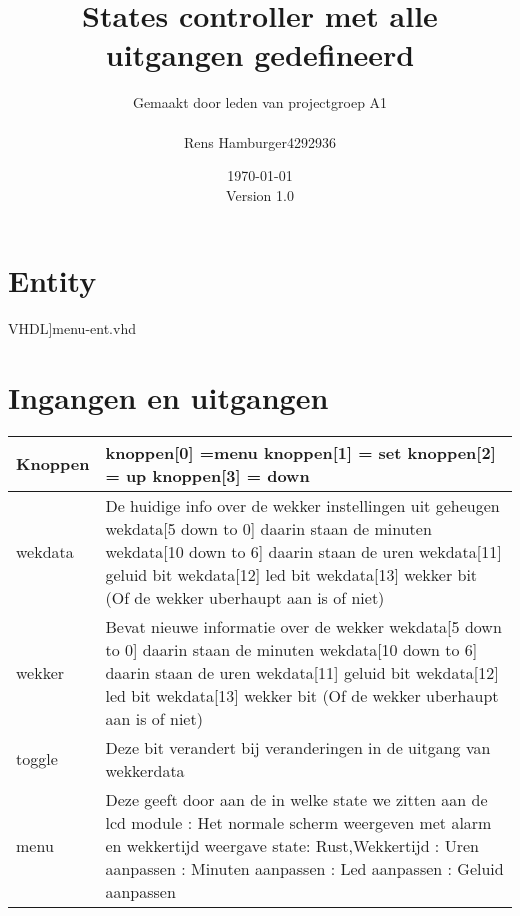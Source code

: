 \documentclass[a4paper, oneside, 10pt]{article}
\title{\textbf{States controller met alle uitgangen gedefineerd}}
\author{
Gemaakt door leden van projectgroep A1\\
\begin{tabular}{c | l}
Rens Hamburger & 4292936 \\
\end{tabular}
}
\date{\today\\ Version 1.0}
\begin{document}
\maketitle

\newpage
\section{Entity}
\scriptsize 
  VHDL]{menu-ent.vhd}
 \normalsize
\section{Ingangen en uitgangen}
\begin{tabular}{|l|p{10cm}|}
Knoppen & knoppen[0] =menu \newline
knoppen[1] = set \newline
knoppen[2] = up\newline
knoppen[3] = down \\ \hline
\hline
wekdata & De huidige info over de wekker instellingen uit geheugen \newline
wekdata[5 down to 0] daarin staan de minuten \newline
wekdata[10 down to 6] daarin staan de uren \newline
wekdata[11] geluid bit \newline
wekdata[12] led bit \newline
wekdata[13] wekker bit (Of de wekker uberhaupt aan is of niet) \\ \hline
wekker & Bevat nieuwe informatie over de wekker \newline
wekdata[5 down to 0] daarin staan de minuten \newline
wekdata[10 down to 6] daarin staan de uren \newline
wekdata[11] geluid bit \newline
wekdata[12] led bit \newline
wekdata[13] wekker bit (Of de wekker uberhaupt aan is of niet) \\ \hline
toggle & Deze bit verandert bij veranderingen in de uitgang van wekkerdata \\ \hline
menu & Deze geeft door aan de in welke state we zitten aan de lcd module \newline
000 : Het normale scherm weergeven met alarm en wekkertijd weergave state: Rust,Wekkertijd \newline
001 : Uren aanpassen \newline
010 : Minuten aanpassen \newline
011 : Led aanpassen \newline
100 : Geluid aanpassen \\ \hline
\end{tabular}
\end{document}

